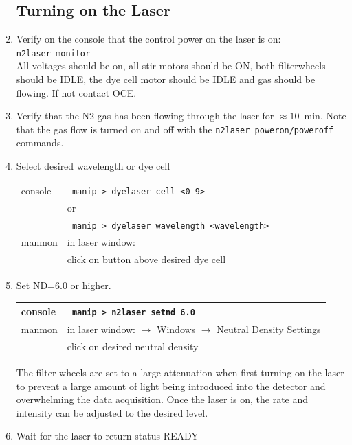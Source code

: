 \documentclass[11pt]{article}
\begin{document}
\begin{enumerate}
\subsection{Turning on the Laser}
\item \CheckBox[name=rlup47]{} Verify on the console that the control power on the laser is on: \\ \verb+n2laser monitor+\\ All voltages should be on, all stir motors should be ON, both filterwheels should be IDLE, the dye cell motor should be IDLE and gas should be flowing. If not contact OCE.
\item \CheckBox[name=rlup48]{} Verify that the N2 gas has been flowing through the laser for $\approx 10$~min. Note that the gas flow is turned on and off with the \verb+n2laser poweron/poweroff+ commands.
\item \CheckBox[name=rlup49]{} Select desired wavelength or dye cell
\begin{center}
\begin{tabular}{|l|l|}
\hline
console & \verb+ manip > dyelaser cell <0-9>+ \\
 & or \\
 & \verb+ manip > dyelaser wavelength <wavelength>+ \\
\hline
manmon & in laser window: \\ & click on button above desired dye cell \\
\hline
\end{tabular}
\end{center}
\item \CheckBox[name=rlup50]{} Set ND=6.0 or higher.
\begin{center}
\begin{tabular}{|l|l|}
\hline
console & \verb+ manip > n2laser setnd 6.0+ \\
\hline
manmon & in laser window: $\to$ Windows $\to$ Neutral Density Settings\\
& click on desired neutral density \\
\hline
\end{tabular}
\end{center}
The filter wheels are set to a large attenuation when first turning on the laser to prevent a large amount of light being introduced into the detector and overwhelming the data acquisition. Once the laser is on, the rate and intensity can be adjusted to the desired level.
\item  \CheckBox[name=rlup51]{} Wait for the laser to return status READY

\end{enumerate}
\end{document}
